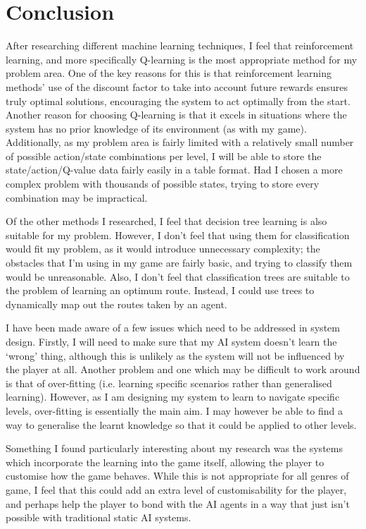 \documentclass[a4paper,oneside]{report}
\begin{document}
\section{Conclusion}

After researching different machine learning techniques, I feel that reinforcement learning, and more specifically Q-learning is the most appropriate method for my problem area. One of the key reasons for this is that reinforcement learning methods' use of the discount factor to take into account future rewards ensures truly optimal solutions, encouraging the system to act optimally from the start. Another reason for choosing Q-learning is that it excels in situations where the system has no prior knowledge of its environment (as with my game). Additionally, as my problem area is fairly limited with a relatively small number of possible action/state combinations per level, I will be able to store the state/action/Q-value data fairly easily in a table format. Had I chosen a more complex problem with thousands of possible states, trying to store every combination may be impractical.

Of the other methods I researched, I feel that decision tree learning is also suitable for my problem. However, I don't feel that using them for classification would fit my problem, as it would introduce unnecessary complexity; the obstacles that I'm using in my game are fairly basic, and trying to classify them would be unreasonable. Also, I don't feel that classification trees are suitable to the problem of learning an optimum route. Instead, I could use trees to dynamically map out the routes taken by an agent.

I have been made aware of a few issues which need to be addressed in system design. Firstly, I will need to make sure that my AI system doesn't learn the `wrong' thing, although this is unlikely as the system will not be influenced by the player at all. Another problem and one which may be difficult to work around is that of over-fitting (i.e. learning specific scenarios rather than generalised learning). However, as I am designing my system to learn to navigate specific levels, over-fitting is essentially the main aim. I may however be able to find a way to generalise the learnt knowledge so that it could be applied to other levels. 

Something I found particularly interesting about my research was the systems which incorporate the learning into the game itself, allowing the player to customise how the game behaves. While this is not appropriate for all genres of game, I feel that this could add an extra level of customisability for the player, and perhaps help the player to bond with the AI agents in a way that just isn't possible with traditional static AI systems.
\end{document}
